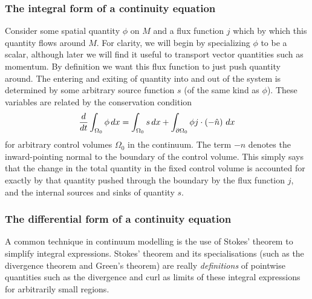 \subsubsection{The integral form of a continuity equation}
Consider some spatial quantity $\phi$ on $M$ and a flux function $j$ which by which
this quantity flows around $M$. For clarity, we will begin by specializing $\phi$ to be a scalar, although later we will find it useful to
transport vector quantities such as momentum. By definition we want this flux function to just push quantity around.
The entering and exiting of quantity into and out of the system is determined by some arbitrary source function $s$ (of the same kind as $\phi$). These variables are related by the
conservation condition
\begin{equation}\label{continuity_equation}
    \frac{d}{dt} \int_{\Omega_0} \phi\,dx = \int_{\Omega_0} s\,dx + \int_{{\partial\Omega_0}} \phi j \cdot \left(-\hat{n}\right)\,dx
\end{equation}
for arbitrary control volumes $\Omega_0$ in the continuum. The term $-\hat{n}$ denotes the inward-pointing normal to the boundary of the control volume. This simply says that the change in the total quantity in the fixed control volume is accounted for exactly by that quantity pushed through the boundary by the flux function $j$, and the internal sources and sinks of quantity $s$.

\subsubsection{The differential form of a continuity equation}
A common technique in continuum modelling is the use of Stokes' theorem to simplify integral expressions.
Stokes' theorem and its specialisations (such as the divergence theorem and Green's theorem) are really \textit{definitions} of pointwise quantities
such as the divergence and curl as limits of these integral expressions for arbitrarily small regions.

